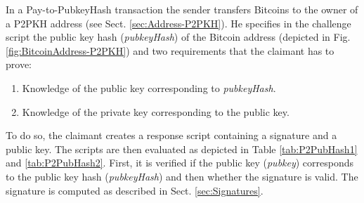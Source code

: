 \noindent
In a Pay-to-PubkeyHash transaction the sender transfers Bitcoins to the owner of a P2PKH address (see Sect. \ref{sec:Address-P2PKH}). He specifies in the challenge script the public key hash (\textit{pubkeyHash}) of the Bitcoin address (depicted in Fig. \ref{fig:BitcoinAddress-P2PKH}) and two requirements that the claimant has to prove:

\begin{enumerate}[label=\arabic*), leftmargin=1cm]
\item Knowledge of the public key corresponding to \textit{pubkeyHash}.
\item Knowledge of the private key corresponding to the public key.
\end{enumerate}

\noindent
To do so, the claimant creates a response script containing a signature and a public key. The scripts are then evaluated as depicted in Table \ref{tab:P2PubHash1} and \ref{tab:P2PubHash2}. First, it is verified if the public key (\textit{pubkey}) corresponds to the public key hash (\textit{pubkeyHash}) and then whether the signature is valid. The signature is computed as described in Sect. \ref{sec:Signatures}.~\\


